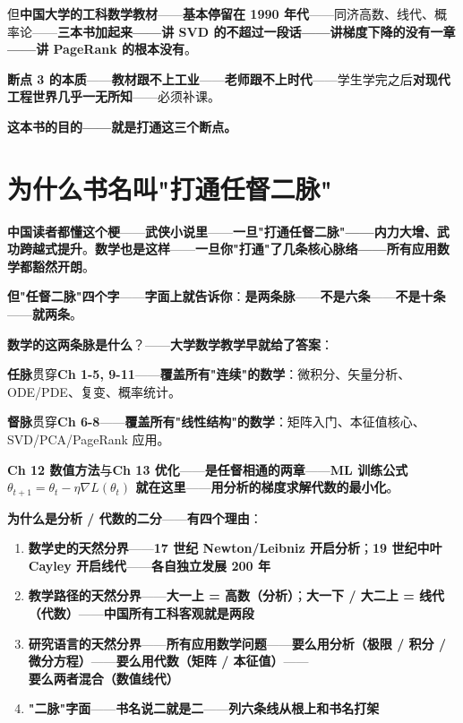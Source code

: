 但\textbf{中国大学的工科数学教材}——\textbf{基本停留在 1990 年代}——同济高数、线代、概率论——\textbf{三本书加起来——讲 SVD 的不超过一段话——讲梯度下降的没有一章——讲 PageRank 的根本没有}。

\textbf{断点 3 的本质}——\textbf{教材跟不上工业}——\textbf{老师跟不上时代}——学生学完之后\textbf{对现代工程世界几乎一无所知}——必须补课。

\medskip

\textbf{这本书的目的——就是打通这三个断点。}

\section*{为什么书名叫"打通任督二脉"}

\textbf{中国读者都懂这个梗}——\textbf{武侠小说里}——\textbf{一旦"打通任督二脉"——内力大增、武功跨越式提升}。\textbf{数学也是这样}——\textbf{一旦你"打通"了几条核心脉络——所有应用数学都豁然开朗}。

\textbf{但"任督二脉"四个字}——\textbf{字面上就告诉你}：\textbf{是\textbf{两条}脉}——\textbf{不是六条}——\textbf{不是十条}——\textbf{就两条}。

\textbf{数学的这两条脉是什么}？——\textbf{大学数学教学早就给了答案}：

\begin{center}
\end{center}

\textbf{任脉}贯穿\textbf{Ch 1-5, 9-11}——\textbf{覆盖所有"连续"的数学}：微积分、矢量分析、ODE/PDE、复变、概率统计。

\textbf{督脉}贯穿\textbf{Ch 6-8}——\textbf{覆盖所有"线性结构"的数学}：矩阵入门、本征值核心、SVD/PCA/PageRank 应用。

\textbf{Ch 12 数值方法}与\textbf{Ch 13 优化}——\textbf{是任督相通的两章}——\textbf{ML 训练公式 $\theta_{t+1}=\theta_t-\eta\nabla L(\theta_t)$ 就在这里}——\textbf{用分析的梯度求解代数的最小化}。

\textbf{为什么是分析 / 代数的二分}——\textbf{有四个理由}：

\begin{enumerate}
\item \textbf{数学史的天然分界}——\textbf{17 世纪 Newton/Leibniz 开启分析}；\textbf{19 世纪中叶 Cayley 开启线代}——\textbf{各自独立发展 200 年}
\item \textbf{教学路径的天然分界}——\textbf{大一上 = 高数（分析）}；\textbf{大一下 / 大二上 = 线代（代数）}——\textbf{中国所有工科客观就是两段}
\item \textbf{研究语言的天然分界}——\textbf{所有应用数学问题}——\textbf{要么用分析（极限 / 积分 / 微分方程）}——\textbf{要么用代数（矩阵 / 本征值）}——\textbf{要么两者混合（数值线代）}
\item \textbf{"二脉"字面}——\textbf{书名说二就是二}——\textbf{列六条线从根上和书名打架}
\end{enumerate}

